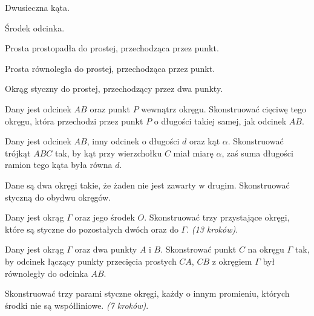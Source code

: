 \begin{problem}
    Dwusieczna kąta.
\end{problem}

\begin{problem}
    Środek odcinka.
\end{problem}

\begin{problem}
    Prosta prostopadła do prostej, przechodząca przez punkt.
\end{problem}

\begin{problem}
    Prosta równoległa do prostej, przechodząca przez punkt.
\end{problem}

\begin{problem}
    Okrąg styczny do prostej, przechodzący przez dwa punkty.
\end{problem}


\begin{problem}
    Dany jest odcinek $AB$ oraz punkt $P$ wewnątrz okręgu.
    Skonstruować cięciwę tego okręgu, która przechodzi przez punkt $P$ o długości takiej samej, jak odcinek $AB$.
\end{problem}

\begin{problem}
    Dany jest odcinek $AB$, inny odcinek o długości $d$ oraz kąt $\alpha$.
    Skonstruować trójkąt $ABC$ tak, by kąt przy wierzchołku $C$ miał miarę $\alpha$, zaś suma długości ramion tego kąta była równa $d$.
\end{problem}

\begin{problem}
    Dane są dwa okręgi takie, że żaden nie jest zawarty w drugim.
    Skonstruować styczną do obydwu okręgów.
\end{problem}

\begin{problem}
    Dany jest okrąg $\Gamma$ oraz jego środek $O$.
    Skonstruować trzy przystające okręgi, które są styczne do pozostałych dwóch oraz do $\Gamma$. \hfill \emph{(13 kroków)}. %
\end{problem}

\begin{problem}
    Dany jest okrąg $\Gamma$ oraz dwa punkty $A$ i $B$.
    Skonstrować punkt $C$ na okręgu $\Gamma$ tak, by odcinek łączący punkty przecięcia prostych $CA$, $CB$ z okręgiem $\Gamma$ był równoległy do odcinka $AB$.
\end{problem}

\begin{problem}
    Skonstruować trzy parami styczne okręgi, każdy o innym promieniu, których środki nie są współliniowe. \hfill \emph{(7 kroków)}. %
\end{problem}